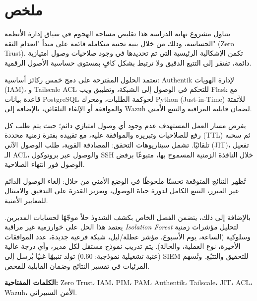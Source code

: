 \chapter*{\textarabic{ملخص}}

\begin{Arabic}

يتناول مشروع نهاية الدراسة هذا تقليص مساحة الهجوم في سياق إدارة الأنظمة الحساسة، وذلك من خلال بنية تحتية متكاملة قائمة على مبدأ "انعدام الثقة" (Zero Trust). تكمن الإشكالية الرئيسية التي تم تحديدها في وجود صلاحيات وصول امتيازية دائمة، تفتقر إلى التتبع الدقيق ولا ترتبط بشكل كافٍ بمستوى حساسية الأصول الرقمية.

تعتمد الحلول المقترحة على دمج خمس ركائز أساسية: Authentik لإدارة الهويات (IAM)، و Tailscale ACL للتحكم في الوصول إلى الشبكة، وتطبيق ويب Flask مع قاعدة بيانات PostgreSQL لحوكمة الطلبات، ومحرك Python (Just-in-Time) للأتمتة والموافقة أو الإلغاء التلقائي، بالإضافة إلى Wazuh لضمان قابلية المراقبة والتتبع الأمني.

يفرض مسار العمل المستهدف عدم وجود أي وصول امتيازي دائم؛ حيث يتم طلب كل رفع للصلاحيات وتبريره والموافقة عليه، مع تقييده بفترة زمنية محددة (TTL) ثم سحبه تلقائيًا. تشمل سيناريوهات التحقق: المصادقة القوية، طلب الوصول الآني (JIT)، تفعيل الـ ACL، والوصول عبر بروتوكول SSH خلال النافذة الزمنية المسموح بها، متبوعًا برفض الوصول فور انتهاء الصلاحية.

تُظهر النتائج المتوقعة تحسنًا ملحوظًا في الوضع الأمني من خلال: إلغاء الوصول الدائم غير المبرر، التتبع الكامل لدورة حياة الوصول، وتعزيز القدرة على التدقيق والامتثال للمعايير الأمنية.

بالإضافة إلى ذلك، يتضمن الفصل الخاص بكشف الشذوذ حلاً موجّهًا لحسابات المديرين. يعتمد هذا الحل على خوارزمية غير مراقبة \textit{Isolation Forest} لتحليل مؤشرات زمنية وسلوكية (الساعة، يوم الأسبوع، مؤشر عطلة/ليل، شبكة فرعية جديدة، عدد الموافقات الأخيرة، نوع العملية، والحالة). يتم تدريب نموذج مستقل لكل مدير، وأي درجة عالية (عتبة تشغيلية نموذجية: 0.60) تولد تنبيهًا غنيًا يُرسل إلى SIEM للتحقيق والتتبّع. وتُسهم المرئيات في تفسير النتائج وضمان القابلية للفحص.

\textbf{الكلمات المفتاحية:} Zero Trust، IAM، PIM، PAM، Authentik، Tailscale، JIT، ACL، Wazuh، الأمن السيبراني.

\end{Arabic}

\clearpage